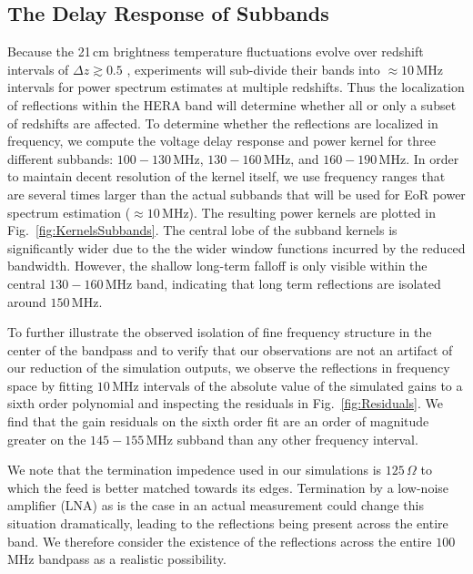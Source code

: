 \documentclass[twocolumn]{emulateapj}
\begin{document}
\subsection{The Delay Response of Subbands}\label{ssec:Subbands}
Because the 21\,cm brightness temperature fluctuations evolve over redshift intervals of $\Delta z \gtrsim 0.5$ \citep{Zaldarriaga:2004}, experiments will sub-divide their bands into $\approx 10$\,MHz intervals for power spectrum estimates at multiple redshifts. Thus the localization of reflections within the HERA band will determine whether all or only a subset of redshifts are affected. To determine whether the reflections are localized in frequency, we compute the voltage delay response and power kernel for three different subbands: $100-130$\,MHz, $130-160$\,MHz, and $160-190$\,MHz. In order to maintain decent resolution of the kernel itself, we use frequency ranges that are several times larger than the actual subbands that will be used for EoR power spectrum estimation ($\approx 10$\,MHz). The resulting power kernels are plotted in Fig.~\ref{fig:KernelsSubbands}. The central lobe of the subband kernels is significantly wider due to the the wider window functions incurred by the reduced bandwidth. However, the shallow long-term falloff is only visible within the central $130-160$\,MHz band, indicating that long term reflections are isolated around $150$\,MHz.

To further illustrate the observed isolation of fine frequency structure in the center of the bandpass and to verify that our observations are not an artifact of our reduction of the simulation outputs, we observe the reflections in frequency space by fitting $10$\,MHz intervals of the absolute value of the simulated gains to a sixth order polynomial and inspecting the residuals in Fig.~\ref{fig:Residuals}. We find that the gain residuals on the sixth order fit are an order of magnitude greater on the $145-155$\,MHz subband than  any other frequency interval. 

We note that the termination impedence used in our simulations is $125$\,$\Omega$ to which the feed is better matched towards its edges. Termination by a low-noise amplifier (LNA) as is the case in an actual measurement could change this situation dramatically, leading to the reflections being present across the entire band. We therefore consider the existence of the reflections across the entire $100$\,MHz bandpass as a realistic possibility.
\end{document}

